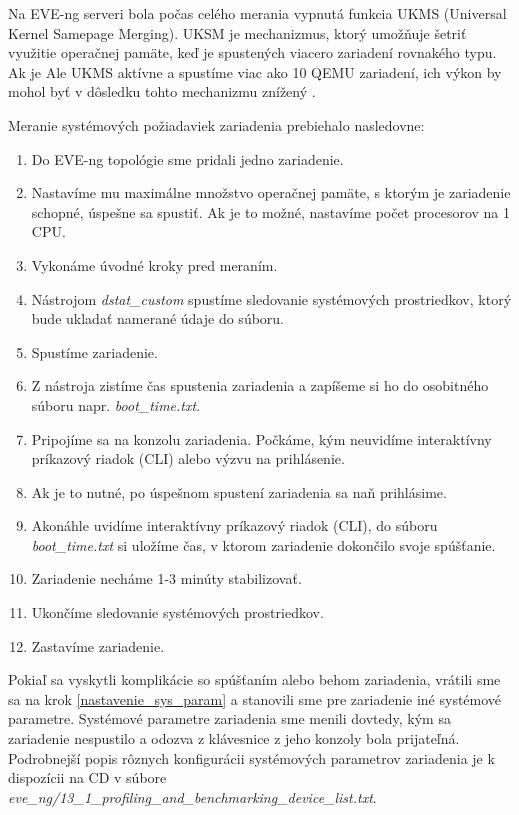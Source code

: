 Na EVE-ng serveri bola počas celého merania vypnutá funkcia UKMS (Universal Kernel Samepage Merging). UKSM je mechanizmus, ktorý umožňuje šetriť využitie operačnej pamäte, keď je spustených viacero zariadení rovnakého typu. Ak je Ale UKMS aktívne a spustíme viac ako 10 QEMU zariadení, ich výkon by mohol byť v dôsledku tohto mechanizmu znížený \cite{eve_ng_faq}.

\noindent
Meranie systémových požiadaviek zariadenia prebiehalo nasledovne:

\begin{enumerate}
    \item Do EVE-ng topológie sme pridali jedno zariadenie.
    \item \label{nastavenie_sys_param} Nastavíme mu maximálne množstvo operačnej pamäte, s ktorým je zariadenie schopné, úspešne sa spustiť. Ak je to možné, nastavíme počet procesorov na 1 CPU.
    \item Vykonáme úvodné kroky pred meraním.
    \item Nástrojom \emph{dstat\_custom} spustíme sledovanie systémových prostriedkov, ktorý bude ukladať namerané údaje do súboru.
    \item Spustíme zariadenie.
    \item Z nástroja zistíme čas spustenia zariadenia a zapíšeme si ho do osobitného súboru napr. \emph{boot\_time.txt}.
    \item Pripojíme sa na konzolu zariadenia. Počkáme, kým neuvidíme interaktívny príkazový riadok (CLI) alebo výzvu na prihlásenie.
    \item Ak je to nutné, po úspešnom spustení zariadenia sa naň prihlásime.
    \item Akonáhle uvidíme interaktívny príkazový riadok (CLI), do súboru \emph{boot\_time.txt} si uložíme čas, v ktorom zariadenie dokončilo svoje spúšťanie. 
    \item Zariadenie necháme 1-3 minúty stabilizovať.
    \item Ukončíme sledovanie systémových prostriedkov.
    \item Zastavíme zariadenie.
\end{enumerate}

Pokiaľ sa vyskytli komplikácie so spúšťaním alebo behom zariadenia, vrátili sme sa na krok \ref{nastavenie_sys_param} a stanovili sme pre zariadenie iné systémové parametre. Systémové parametre zariadenia sme menili dovtedy, kým sa zariadenie nespustilo a odozva z klávesnice z jeho konzoly bola prijateľná. Podrobnejší popis rôznych konfigurácii systémových parametrov zariadenia je k dispozícii na CD v súbore \emph{eve\_ng/13\_1\_profiling\_and\_benchmarking\_device\_list.txt}.

